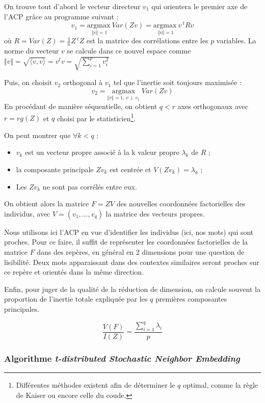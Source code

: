 \documentclass[11pt,french,french]{article}
\providecommand{\tightlist}{%
  \setlength{\parskip}{0pt}
  }
\let\rmarkdownfootnote\footnote%
\def\footnote{\protect\rmarkdownfootnote}
\begin{document}
On trouve tout d'abord le vecteur directeur \(v_1\) qui orientera le
premier axe de l'ACP grâce au programme suivant :
\[v_1 =\underset{\Vert v \Vert = 1}{\mathrm{argmax~}} Var(Zv) =\underset{\Vert v \Vert = 1}{\mathrm{argmax~}} v\,^t R v \]
où \(R = Var(Z) = \frac{1}{n} Z\,^t Z\) est la matrice des corrélations
entre les \(p\) variables. La norme du vecteur \(v\) se calcule dans ce
nouvel espace comme
\(\Vert v \Vert = \sqrt{\langle v,v\rangle} = v ^tv =\sqrt{ \sum \limits_{i = 1}^p v_i^2}\)

Puis, on choisit \(v_2\) orthogonal à \(v_1\) tel que l'inertie soit
toujours maximisée :
\[v_2 =\underset{ \Vert v \Vert = 1,\,v \perp v_1}{\mathrm{argmax}}\;  Var(Zv) \]
En procédant de manière séquentielle, on obtient \(q < r\) axes
orthogonaux avec \(r = rg(Z)\) et \(q\) choisi par le
statisticien\footnote{Différentes méthodes existent afin de déterminer
  le \(q\) optimal, comme la règle de Kaiser ou encore celle du coude.}.

On peut montrer que \(\forall k < q\) :

\begin{itemize}
\tightlist
\item
  \(v_k\) est un vecteur propre associé à la k\ieme{} valeur propre
  \(\lambda_k\) de \(R\) ;
\item
  la composante principale \(Zv_k\) est centrée et
  \(V(Zv_k)= \lambda_k\) ;
\item
  Les \(Zv_k\) ne sont pas corrélés entre eux.
\end{itemize}

On obtient alors la matrice \(F = ZV\) des nouvelles coordonnées
factorielles des individus, avec \(V = (v_1,\dots,v_q)\) la matrice des
vecteurs propres.

Nous utilisons ici l'ACP en vue d'identifier les individus (ici, nos
mots) qui sont proches. Pour ce faire, il suffit de représenter les
coordonnées factorielles de la matrice \(F\) dans des repères, en
général en 2 dimensions pour une question de lisibilité. Deux mots
apparaissant dans des contextes similaires seront proches sur ce repère
et orientés dans la même direction.

Enfin, pour juger de la qualité de la réduction de dimension, on calcule
souvent la proportion de l'inertie totale expliquée par les \(q\)
premières composantes principales.

\[ \frac{V(F)}{I(Z)} = \frac{\sum \limits_{i = 1}^q \lambda_i}{p}\]

\subsubsection{\texorpdfstring{Algorithme \emph{t-distributed Stochastic
Neighbor
Embedding}}{Algorithme t-distributed Stochastic Neighbor Embedding}}\label{algorithme-t-distributed-stochastic-neighbor-embedding}
\end{document}
